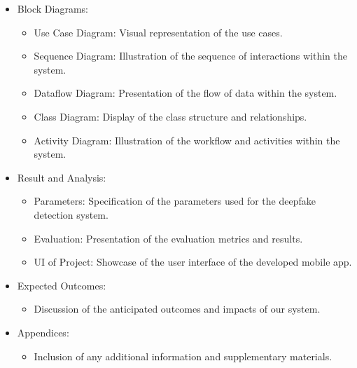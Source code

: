 \begin{itemize}
\begin{itemize}
      \end{itemize}
      \item Block Diagrams:
      \begin{itemize}
        \item Use Case Diagram: Visual representation of the use cases.
        \item Sequence Diagram: Illustration of the sequence of interactions within the system.
        \item Dataflow Diagram: Presentation of the flow of data within the system.
        \item Class Diagram: Display of the class structure and relationships.
        \item Activity Diagram: Illustration of the workflow and activities within the system.
      \end{itemize}
  
    \item Result and Analysis:
      \begin{itemize}
        \item Parameters: Specification of the parameters used for the deepfake detection system.
        \item Evaluation: Presentation of the evaluation metrics and results.
        \item UI of Project: Showcase of the user interface of the developed mobile app.
      \end{itemize}
  
    \item Expected Outcomes:
      \begin{itemize}
        \item Discussion of the anticipated outcomes and impacts of our system.
      \end{itemize}
  
    \item Appendices:
      \begin{itemize}
        \item Inclusion of any additional information and supplementary materials.
      \end{itemize}
  \end{itemize}

